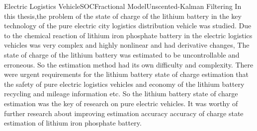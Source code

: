 
\begin{Eabstract}{Electric Logistics Vehicle}{SOC}{Fractional Model}{Unscented-Kalman Filtering}{}
In this thesis,the problem of the state of charge of the lithium battery in the key technology of the pure electric city logistics distribution vehicle was studied. Due to the chemical reaction of lithium iron phosphate battery in the electric logistics vehicles was very complex and highly nonlinear and had derivative changes, The state of charge of the lithium battery was estimated to be uncontrollable and erroneous. So the estimation method had its own difficulty and complexity. There were urgent requirements for the lithium battery state of charge estimation that the safety of pure electric logistics vehicles and economy of the lithium battery recycling and mileage information etc. So the lithium battery state of charge estimation was the key of research on pure electric vehicles. It was worthy of further research about improving estimation accuracy accuracy of charge state estimation of lithium iron phosphate battery.


\end{Eabstract}
